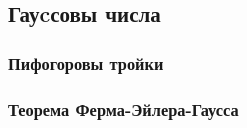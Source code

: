 \subsection{Гауcсовы числа}
\subsubsection{Пифогоровы тройки}
\subsubsection{Теорема Ферма-Эйлера-Гаусса}
